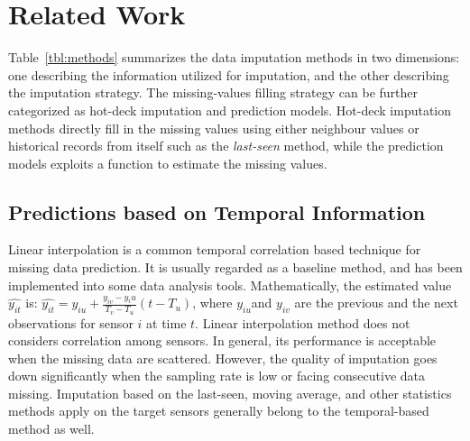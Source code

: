 \section{Related Work}\label{sec:rw}



Table~\ref{tbl:methods} summarizes the data imputation methods in two dimensions: one describing the information utilized for imputation, and the other describing the imputation strategy. The missing-values filling strategy can be further categorized as hot-deck imputation and prediction models\cite{Garcia:KNNreview}. 
Hot-deck imputation methods directly fill in the missing values using either neighbour values or historical records from itself such as the \textit{last-seen} method, while the prediction models exploits a function to estimate the missing values. 



\subsection{Predictions based on Temporal Information }
Linear interpolation is a common temporal correlation based technique for missing data prediction. 
It is usually regarded as a baseline method, and has been implemented into some data analysis tools. Mathematically, the estimated value $\hat{y_{it}}$ is:
$\hat{y_{it}} = y_{iu} + \frac{y_{iv}-y{_iu}}{T_v-T_u}(t-T_u)$, where $y_{iu}$and $y_{iv}$ are the previous and the next observations for sensor $i$ at time $t$.
Linear interpolation method does not considers correlation among sensors. In general, its performance is acceptable when the missing data are scattered. 
However, the quality of imputation goes down significantly when the sampling rate is low or facing consecutive data missing. 
Imputation based on the last-seen, moving average, and other statistics methods apply on the target sensors generally belong to the temporal-based method as well.
